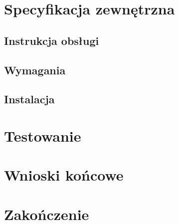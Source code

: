 \documentclass{book}
\begin{document}
		
	\chapter{Specyfikacja zewnętrzna}
		\section{Instrukcja obsługi}
		\section{Wymagania}
		\section{Instalacja}
		
	\chapter{Testowanie}
	
	\chapter{Wnioski końcowe}
	
	\chapter{Zakończenie}
	
\end{document}
